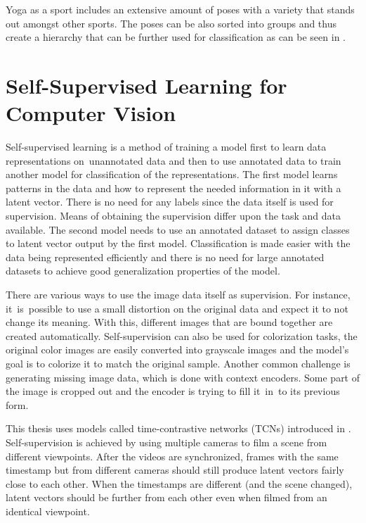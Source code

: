 Yoga as a sport includes an extensive amount of poses with a variety that stands out amongst other sports. The poses can be also sorted into groups and thus create a hierarchy that can be further used for classification as can be seen in \cite{verma2020yoga}.

\section{\label{sec:self-supervised}Self-Supervised Learning for Computer Vision}

Self-supervised learning is a method of training a model first to learn data representations on~unannotated data and then to use annotated data to train another model for classification of the representations. The first model learns patterns in the data and how to represent the needed information in it with a latent vector. There is no need for any labels since the data itself is used for supervision. Means of obtaining the supervision differ upon the task and data available. The second model needs to use an annotated dataset to assign classes to latent vector output by the first model. Classification is made easier with the data being represented efficiently and there is no need for large annotated datasets to achieve good generalization properties of the model.

There are various ways to use the image data itself as supervision. For instance, it~is~possible to use a small distortion on the original data and expect it to not change its meaning. With this, different images that are bound together are created automatically. Self-supervision can also be used for colorization tasks, the original color images are easily converted into grayscale images and the model's goal is to colorize it to match the original sample. Another common challenge is generating missing image data, which is done with context encoders. Some part of the image is cropped out and the encoder is trying to fill it~in~to its previous form.

This thesis uses models called time-contrastive networks (TCNs) introduced in \cite{sermanet2018timecontrastive}. Self-supervision is achieved by using multiple cameras to film a scene from different viewpoints. After the videos are synchronized, frames with the same timestamp but from different cameras should still produce latent vectors fairly close to each other. When the timestamps are different (and the scene changed), latent vectors should be further from each other even when filmed from an identical viewpoint.

